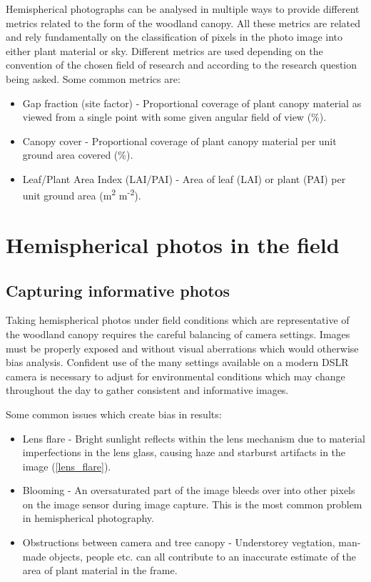 \documentclass{article}
\begin{document}
Hemispherical photographs can be analysed in multiple ways to provide different metrics related to the form of the woodland canopy. All these metrics are related and rely fundamentally on the classification of pixels in the photo image into either plant material or sky. Different metrics are used depending on the convention of the chosen field of research and according to the research question being asked. Some common metrics are:

\begin{itemize}
	\item{Gap fraction (site factor) - Proportional coverage of plant canopy material as viewed from a single point with some given angular field of view (\%).}
	\item{Canopy cover - Proportional coverage of plant canopy material per unit ground area covered (\%).}
	\item{Leaf/Plant Area Index (LAI/PAI) - Area of leaf (LAI) or plant (PAI) per unit ground area (m\textsuperscript{2} m\textsuperscript{-2}).}
\end{itemize}

\section{Hemispherical photos in the field}

\subsection{Capturing informative photos}

Taking hemispherical photos under field conditions which are representative of the woodland canopy requires the careful balancing of camera settings. Images must be properly exposed and without visual aberrations which would otherwise bias analysis. Confident use of the many settings available on a modern DSLR camera is necessary to adjust for environmental conditions which may change throughout the day to gather consistent and informative images.

Some common issues which create bias in results:

\begin{itemize}
	\item{Lens flare - Bright sunlight reflects within the lens mechanism due to material imperfections in the lens glass, causing haze and starburst artifacts in the image (\autoref{lens_flare}).}
	\item{Blooming - An oversaturated part of the image bleeds over into other pixels on the image sensor during image capture. This is the most common problem in hemispherical photography.}
	\item{Obstructions between camera and tree canopy - Understorey vegtation, man-made objects, people etc. can all contribute to an inaccurate estimate of the area of plant material in the frame.}
\end{itemize}
\end{document}
